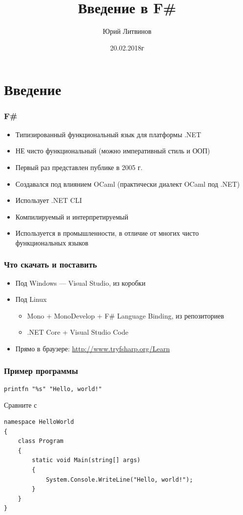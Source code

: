 \documentclass[xetex,mathserif,serif]{beamer}
\title{Введение в F\#}
\author{Юрий Литвинов}
\date{20.02.2018г}
\begin{document}
	
	\frame{\titlepage}
	
	\section{Введение}
	
	\begin{frame}
		\frametitle{F\#}
		\begin{itemize}
			\item Типизированный функциональный язык для платформы .NET
			\item НЕ чисто функциональный (можно императивный стиль и ООП)
			\item Первый раз представлен публике в 2005 г.
			\item Создавался под влиянием OCaml (практически диалект OCaml под .NET)
			\item Использует .NET CLI
			\item Компилируемый и интерпретируемый
			\item Используется в промышленности, в отличие от многих чисто функциональных языков
		\end{itemize}
	\end{frame}

	\begin{frame}
		\frametitle{Что скачать и поставить}
		\begin{itemize}
			\item Под Windows --- Visual Studio, из коробки
			\item Под Linux
			\begin{itemize}
				\item Mono + MonoDevelop + F\# Language Binding, из репозиториев
				\item .NET Core + Visual Studio Code
			\end{itemize}
			\item Прямо в браузере: \url{http://www.tryfsharp.org/Learn}
		\end{itemize}
	\end{frame}
	
	\begin{frame}[fragile]
		\frametitle{Пример программы}
		\begin{verbatim}
printfn "%s" "Hello, world!"
		\end{verbatim}
		Сравните с
		\begin{verbatim}
namespace HelloWorld
{
    class Program
    {
        static void Main(string[] args)
        {
            System.Console.WriteLine("Hello, world!");
        }
    }
}
		\end{verbatim}
	\end{frame}
\end{document}
